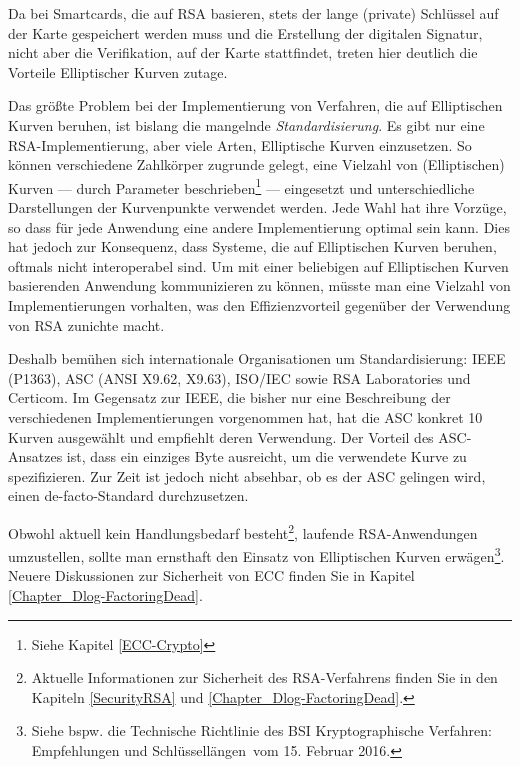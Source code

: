 \begin{refsegment}
Da bei Smartcards, die auf RSA basieren, stets der lange (private)
Schlüssel auf der Karte gespeichert werden muss und die Erstellung
der digitalen Signatur, nicht aber die Verifikation, auf der Karte
stattfindet, treten hier deutlich die Vorteile Elliptischer Kurven zutage.
\par
\smallskip
Das größte Problem bei der Implementierung von Verfahren, die auf Elliptischen Kurven beruhen, ist bislang die
mangelnde {\em Standardisierung}. Es gibt nur eine RSA-Implementierung, aber viele Arten, Elliptische Kurven einzusetzen.
So können verschiedene Zahlkörper zugrunde gelegt, eine Vielzahl von (Elliptischen) Kurven --- durch
Parameter beschrieben\footnote{%
Siehe Kapitel \ref{ECC-Crypto}
} --- eingesetzt und unterschiedliche Darstellungen der Kurvenpunkte verwendet werden.
Jede Wahl hat ihre Vorzüge, so dass für jede Anwendung eine andere Implementierung optimal sein kann. Dies
hat jedoch zur Konsequenz, dass Systeme, die auf Elliptischen Kurven beruhen, oftmals nicht interoperabel
sind. Um mit einer beliebigen auf Elliptischen Kurven basierenden Anwendung kommunizieren zu können, müsste man
eine Vielzahl von Implementierungen vorhalten, was den Effizienzvorteil gegenüber der Verwendung von RSA
zunichte macht.

Deshalb bemühen sich internationale Organisationen um Standardisierung:
IEEE (P1363), ASC (ANSI X9.62, X9.63), ISO/IEC sowie
RSA Laboratories und Certicom.
Im Gegensatz zur IEEE, die bisher nur eine Beschreibung der verschiedenen
Implementierungen vorgenommen hat, hat die ASC konkret 10 Kurven ausgewählt
und empfiehlt deren Verwendung. Der Vorteil des ASC-Ansatzes ist,
dass ein einziges Byte ausreicht, um die verwendete Kurve zu spezifizieren.
Zur Zeit ist jedoch nicht absehbar, ob es der ASC gelingen wird, einen
de-facto-Standard durchzusetzen.

Obwohl aktuell kein Handlungsbedarf besteht\footnote{%
  Aktuelle Informationen zur Sicherheit des RSA-Verfahrens finden Sie in
  den Kapiteln \ref{SecurityRSA} und \ref{Chapter_Dlog-FactoringDead}.
},
laufende RSA-Anwendungen umzustellen, sollte man ernsthaft den Einsatz
von Elliptischen Kurven erwägen\footnote{%
  Siehe bspw. die Technische Richtlinie des BSI \glqq Kryptographische Verfahren:
  Empfehlungen und Schlüssellängen\grqq~vom 15. Februar 2016.
}.
Neuere Diskussionen zur Sicherheit von ECC finden Sie in Kapitel
\ref{Chapter_Dlog-FactoringDead}.



\end{refsegment}

